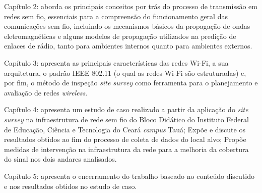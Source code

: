 \begin{compactitem}
	\item Capítulo 2: aborda os principais conceitos por trás do processo de transmissão em redes sem fio, essenciais para a compreensão do funcionamento geral das comunicações sem fio, incluindo os mecanismos básicos da propagação de ondas eletromagnéticas e alguns modelos de propagação utilizados na predição de enlaces de rádio, tanto para ambientes internos quanto para ambientes externos.
	
	\item Capítulo 3: apresenta as principais características das redes Wi-Fi, a sua arquitetura, o padrão IEEE 802.11 (o qual as redes Wi-Fi são estruturadas) e, por fim, o método de inspeção \textit{site survey} como ferramenta para o planejamento e avaliação de redes \textit{wireless}.
	
	\item Capítulo 4: apresenta um estudo de caso realizado a partir da aplicação do \textit{site survey} na infraestrutura de rede sem fio do Bloco Didático do Instituto Federal de Educação, Ciência e Tecnologia do Ceará \textit{campus} Tauá; Expõe e discute os resultados obtidos ao fim do processo de coleta de dados do local alvo; Propõe medidas de intervenção na infraestrutura da rede para a melhoria da cobertura do sinal nos dois andares analisados.
	
	\item Capítulo 5: apresenta o encerramento do trabalho baseado no conteúdo discutido e nos resultados obtidos no estudo de caso.
\end{compactitem}